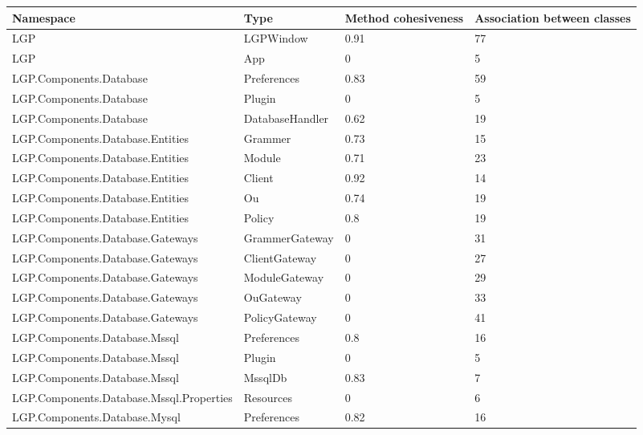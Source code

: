 			\begin{table}[h!t]
				\footnotesize{\begin{tabular}{ | p{85mm} | p{35mm} | p{13mm} | p{14mm}  | }	
																						\hline
				Namespace & Type  & Method cohesiveness & Association between classes  \\ \hline
				LGP   & LGPWindow & \cellcolor{ored}0.91  & \cellcolor{ored}77  \\ \hline
				LGP   & App   & 0     & 5  \\ \hline
				LGP.Components.Database & Preferences & 0.83  & \cellcolor{ored}59  \\ \hline
				LGP.Components.Database & Plugin & 0     & 5  \\ \hline
				LGP.Components.Database & DatabaseHandler & 0.62  & 19  \\ \hline
				LGP.Components.Database.Entities & Grammer & 0.73  & 15  \\ \hline
				LGP.Components.Database.Entities & Module & 0.71  & 23  \\ \hline
				LGP.Components.Database.Entities & Client & \cellcolor{ored}0.92  & 14  \\ \hline
				LGP.Components.Database.Entities & Ou    & 0.74  & 19  \\ \hline
				LGP.Components.Database.Entities & Policy & 0.8   & 19  \\ \hline
				LGP.Components.Database.Gateways & GrammerGateway & 0     & 31  \\ \hline
				LGP.Components.Database.Gateways & ClientGateway & 0     & 27  \\ \hline
				LGP.Components.Database.Gateways & ModuleGateway & 0     & 29  \\ \hline
				LGP.Components.Database.Gateways & OuGateway & 0     & 33  \\ \hline
				LGP.Components.Database.Gateways & PolicyGateway & 0     & \cellcolor{ored}41  \\ \hline
				LGP.Components.Database.Mssql & Preferences & 0.8   & 16  \\ \hline
				LGP.Components.Database.Mssql & Plugin & 0     & 5  \\ \hline
				LGP.Components.Database.Mssql & MssqlDb & \cellcolor{ored}0.83  & 7  \\ \hline
				LGP.Components.Database.Mssql.Properties & Resources & 0     & 6  \\ \hline
				LGP.Components.Database.Mysql & Preferences & 0.82  & 16  \\ \hline

\end{tabular}}
\end{table}
